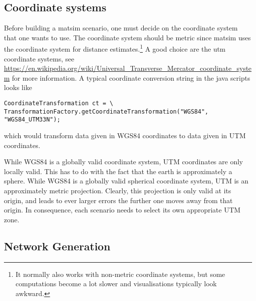 %
%

\subsection{Coordinate systems}

Before building a \gls{matsim} scenario, one must decide on the coordinate system that one wants to use.  The coordinate system should be metric since \gls{matsim} uses the coordinate system for distance estimates.\footnote{%
%
It normally also works with non-metric coordinate systems, but some computations become a lot slower and visualisations typically look awkward.
%
} A good choice are the \gls{utm} coordinate systems, see \url{https://en.wikipedia.org/wiki/Universal_Transverse_Mercator_coordinate_system} for more information.  A typical coordinate conversion string in the \gls{java} scripts looks like
\begin{lstlisting}
CoordinateTransformation ct = \
TransformationFactory.getCoordinateTransformation("WGS84", "WGS84_UTM33N");
\end{lstlisting}
which would transform data given in WGS84 coordinates to data given in UTM coordinates.

While WGS84 is a globally valid coordinate system, UTM coordinates are only locally valid.  This has to do with the fact that the earth is approximately a sphere.  While WGS84 is a globally valid spherical coordinate system, UTM is an approximately metric projection.  Clearly, this projection is only valid at its origin, and leads to ever larger errors the further one moves away from that origin.  In consequence, each scenario needs to select its own appropriate UTM zone.

\subsection{Network Generation}

